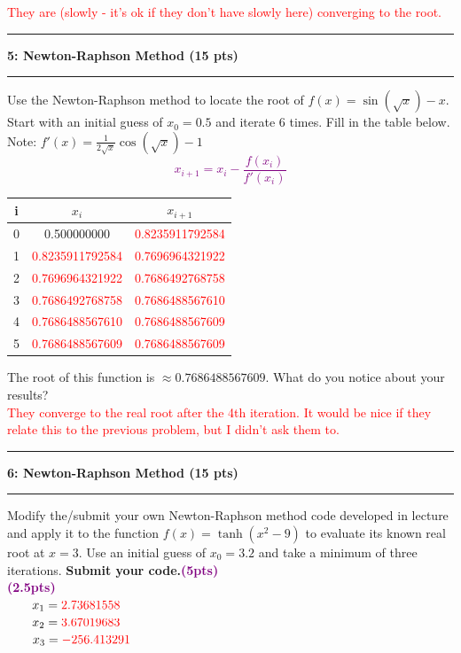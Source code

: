 \documentclass[11pt]{article}
\newcommand\question[2]{\vspace{.25in}\hrule\textbf{#1: #2}\vspace{.5em}\hrule\vspace{.10in}}
\begin{document}
\textcolor{red}{They are (slowly - it's ok if they don't have slowly here) converging to the root.}
\vspace{1cm}



\question{5}{Newton-Raphson Method (15 pts)}
 Use the Newton-Raphson method to locate the root of $f(x)=\sin(\sqrt{x})-x$. Start with an initial guess of $x_0=0.5$ and iterate 6 times. Fill in the table below. Note: $f'(x) = \frac{1}{2\sqrt{x}}\cos(\sqrt{x}) -1$
 \textcolor{purple}{$$x_{i+1} = x_i - \frac{f(x_i)}{f'(x_i)}$$}
\begin{table}[H]
	\centering
	\begin{tabular}{c | c | c}
		i & $x_i$ & $x_{i+1}$ \\
		\hline
		0 & 0.500000000 & \textcolor{red}{0.8235911792584}\\ 
		\hline
		1 & \textcolor{red}{0.8235911792584} & \textcolor{red}{0.7696964321922} \\
		\hline
		2 &	\textcolor{red}{0.7696964321922} & \textcolor{red}{0.7686492768758}\\ 
		\hline
		3 & \textcolor{red}{0.7686492768758} & \textcolor{red}{0.7686488567610}\\
		\hline
		4 & \textcolor{red}{0.7686488567610} & \textcolor{red}{0.7686488567609}\\
		\hline
		5 & \textcolor{red}{0.7686488567609} & \textcolor{red}{0.7686488567609}\\
	\end{tabular}
\end{table}
The root of this function is $\approx 0.7686488567609$. What do you notice about your results?\\
\textcolor{red}{They converge to the real root after the 4th iteration. It would be nice if they relate this to the previous problem, but I didn't ask them to.}

\newpage
\question{6}{Newton-Raphson Method (15 pts)}
Modify the/submit your own Newton-Raphson method code developed in lecture and apply it to the function $f(x) = \tanh(x^2-9)$ to evaluate its known real root at $x = 3$. Use an initial guess of $x_0 = 3.2$ and take a minimum of three iterations. \textbf{Submit your code.\textbf{\textcolor{purple}{(5pts)}}}\\
\vspace{6pt}
\textbf{\textcolor{purple}{(2.5pts)}}\\
$\qquad x_1 = \textcolor{red}{2.73681558}$ \\\vspace{6pt}
$\qquad x_2 = \textcolor{red}{3.67019683}$ \\\vspace{6pt}
$\qquad x_3 = \textcolor{red}{-256.413291}$ \\\vspace{6pt}
\end{document}
